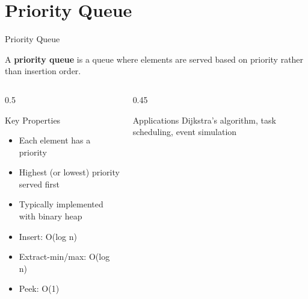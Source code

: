 \documentclass[aspectratio=169,xcolor=dvipsnames]{beamer}
\begin{document}
\section{Priority Queue}

\begin{frame}{Priority Queue}
  \begin{definition}
    A \textbf{priority queue} is a queue where elements are served based on priority rather than insertion order.
  \end{definition}

  \vspace{0.3cm}

  \begin{columns}
    \begin{column}{0.5\textwidth}
      \begin{block}{Key Properties}
        \begin{itemize}
          \item Each element has a priority
          \item Highest (or lowest) priority served first
          \item Typically implemented with binary heap
          \item Insert: O(log n)
          \item Extract-min/max: O(log n)
          \item Peek: O(1)
        \end{itemize}
      \end{block}
    \end{column}
    \begin{column}{0.45\textwidth}

      \vspace{0.3cm}
      \begin{alertblock}{Applications}
        Dijkstra's algorithm, task scheduling, event simulation
      \end{alertblock}
    \end{column}
  \end{columns}
\end{frame}
\end{document}
